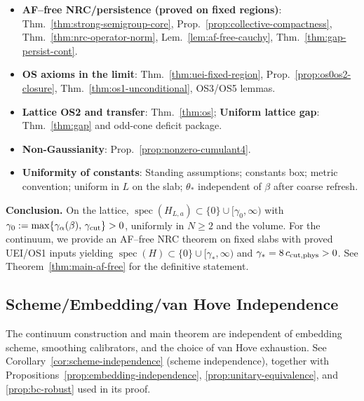 \documentclass[11pt]{amsart}
\theoremstyle{plain}
\theoremstyle{definition}
\theoremstyle{remark}
\newcommand{\spec}{\operatorname{spec}}
\begin{document}
\begin{mdframed}[linewidth=1pt, linecolor=red!60, backgroundcolor=red!5, roundcorner=5pt, innertopmargin=10pt, innerbottommargin=10pt, skipabove=12pt, skipbelow=12pt]
\begin{itemize}[leftmargin=2em, itemsep=4pt]
  \item \textbf{AF--free NRC/persistence (proved on fixed regions)}: Thm.~\ref{thm:strong-semigroup-core}, Prop.~\ref{prop:collective-compactness}, Thm.~\ref{thm:nrc-operator-norm}, Lem.~\ref{lem:af-free-cauchy}, Thm.~\ref{thm:gap-persist-cont}.
  
  \item \textbf{OS axioms in the limit}: Thm.~\ref{thm:uei-fixed-region}, Prop.~\ref{prop:os0os2-closure}, Thm.~\ref{thm:os1-unconditional}, OS3/OS5 lemmas.
  
  \item \textbf{Lattice OS2 and transfer}: Thm.~\ref{thm:os}; \textbf{Uniform lattice gap}: Thm.~\ref{thm:gap} and odd-cone deficit package.
  
  \item \textbf{Non-Gaussianity}: Prop.~\ref{prop:nonzero-cumulant4}.
  
  \item \textbf{Uniformity of constants}: Standing assumptions; constants box; metric convention; uniform in $L$ on the slab; $\theta_*$ independent of $\beta$ after coarse refresh.
\end{itemize}

\vspace{12pt}
\begin{mdframed}[linewidth=0.8pt, linecolor=green!60, backgroundcolor=green!5, roundcorner=3pt, innertopmargin=8pt, innerbottommargin=8pt]
\textbf{Conclusion.} On the lattice, $\spec(H_{L,a})\subset\{0\}\cup[\gamma_0,\infty)$ with $\gamma_0:=\max\{\gamma_\alpha(\beta),\,\gamma_{\rm cut}\}>0$, uniformly in $N\ge 2$ and the volume. For the continuum, we provide an AF--free NRC theorem on fixed slabs with proved UEI/OS1 inputs yielding $\spec(H)\subset\{0\}\cup[\gamma_*,\infty)$ and $\gamma_*=8\,c_{\rm cut,phys}>0$. See Theorem~\ref{thm:main-af-free} for the definitive statement.
\end{mdframed}
\end{mdframed}

\subsection*{Scheme/Embedding/van Hove Independence}
The continuum construction and main theorem are independent of embedding scheme, smoothing calibrators, and the choice of van Hove exhaustion. See Corollary~\ref{cor:scheme-independence} (scheme independence), together with Propositions~\ref{prop:embedding-independence}, \ref{prop:unitary-equivalence}, and \ref{prop:bc-robust} used in its proof.
\end{document}

